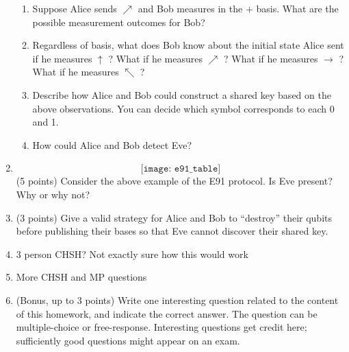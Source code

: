 \documentclass[12pt]{article}
\begin{document}
\begin{enumerate}[font=\bfseries]
\begin{enumerate}
            \item Suppose Alice sends $\nearrow$ and Bob measures in the $+$ basis. What are the possible measurement outcomes for Bob?
            \item Regardless of basis, what does Bob know about the initial state Alice sent if he measures $\uparrow$ ? What if he measures $\nearrow$ ? What if he measures  $\rightarrow$ ? What if he measures $\nwarrow$ ?
            \item Describe how Alice and Bob could construct a shared key based on the above observations. You can decide which symbol corresponds to each 0 and 1. 
            \item How could Alice and Bob detect Eve?
        \end{enumerate}
    \item \[\texttt{[image: e91\_table]}\]
    (5 points) Consider the above example of the E91 protocol. Is Eve present? Why or why not?
    \item (3 points) Give a valid strategy for Alice and Bob to ``destroy'' their qubits before publishing their bases so that Eve cannot discover their shared key. 
    \item 3 person CHSH? Not exactly sure how this would work
    \item More CHSH and MP questions
    \item (Bonus, up to 3 points) Write one interesting question related to the content of this homework, and indicate the correct answer. The question can be multiple-choice or free-response.  Interesting questions get credit here;  sufficiently good questions might appear on an exam.
\end{enumerate}
\end{document}
